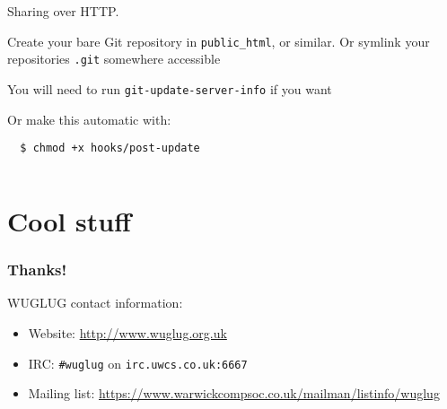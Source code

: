 \documentclass{beamer}
\begin{document}
\begin{frame}[fragile]
    Sharing over HTTP.
    
    Create your bare Git repository in \verb#public_html#, or similar.
    Or symlink your repositories \verb#.git# somewhere accessible

    You will need to run \verb#git-update-server-info# if you want 

    Or make this automatic with:

    \begin{verbatim}
  $ chmod +x hooks/post-update
    \end{verbatim}
\end{frame}

\begin{frame}[fragile]
    \begin{verbatim}
    \end{verbatim}
\end{frame}


\section{Cool stuff}



\frame
{
    \frametitle{Thanks!}
    WUGLUG contact information:
    \begin{itemize}
        \item Website: \url{http://www.wuglug.org.uk}
        \item IRC: {\tt \#wuglug} on {\tt irc.uwcs.co.uk:6667}
        \item Mailing list: \url{https://www.warwickcompsoc.co.uk/mailman/listinfo/wuglug}
    \end{itemize}
}
\end{document}
